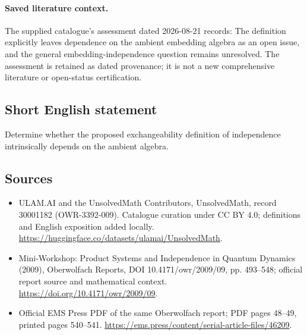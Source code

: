 \documentclass[11pt]{article}
\begin{document}
\paragraph{Saved literature context.} The supplied catalogue's assessment dated 2026-08-21 records: The definition explicitly leaves dependence on the ambient embedding algebra as an open issue, and the general embedding-independence question remains unresolved. The assessment is retained as dated provenance; it is not a new comprehensive literature or open-status certification.
\subsection{Short English statement}
Determine whether the proposed exchangeability definition of independence intrinsically depends on the ambient algebra.
\subsection{Sources}
\begin{itemize}
\item[\hypertarget{source:30001182:1}{S1}] ULAM.AI and the UnsolvedMath Contributors, UnsolvedMath, record 30001182 (OWR-3392-009). Catalogue curation under CC BY 4.0; definitions and English exposition added locally.
\url{https://huggingface.co/datasets/ulamai/UnsolvedMath}.
\item[\hypertarget{source:30001182:2}{S2}] Mini-Workshop: Product Systems and Independence in Quantum Dynamics (2009), Oberwolfach Reports, DOI 10.4171/owr/2009/09, pp. 493--548; official report source and mathematical context.
\url{https://doi.org/10.4171/owr/2009/09}.
\item[\hypertarget{source:30001182:3}{S3}] Official EMS Press PDF of the same Oberwolfach report; PDF pages 48--49, printed pages 540--541.
\url{https://ems.press/content/serial-article-files/46209}.
\end{itemize}
\label{end:30001182}
\end{document}
